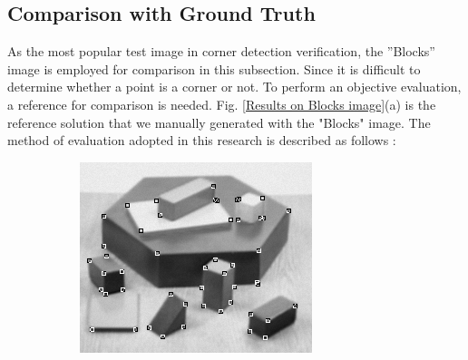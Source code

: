\documentclass[letterpaper, 10 pt, conference]{ieeeconf}  %
\begin{document}
\subsection{Comparison with Ground Truth}
As the most popular test image in corner detection verification, the ”Blocks” image is employed for comparison in this subsection. Since it is difficult to determine whether a point is a corner or not. To perform an objective evaluation, a reference for comparison is needed. Fig. \ref{Results on Blocks image}(a) is the reference solution that we manually generated with the "Blocks" image. The method of evaluation adopted in this research is described as follows \cite{He2008Corner}:  
\begin{figure}[htbp]
	  	\centering
   	\begin{subfigure}[b]{0.49\linewidth}
    	\includegraphics[width=\linewidth]{experiments/blocks_harris.png}
    	\caption{}
   	\end{subfigure}
  	     \begin{subfigure}[b]{0.49\linewidth}

\end{subfigure}
\end{figure}
\end{document}
